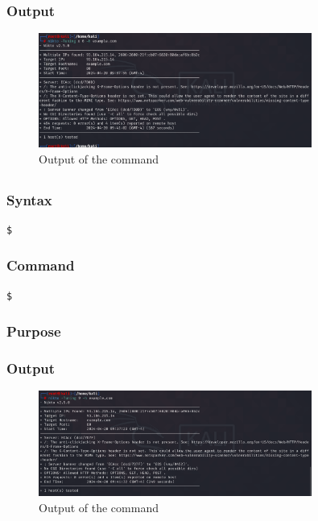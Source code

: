 \documentclass[11pt]{article}
\begin{document}
\subsubsection*{Output}
\begin{figure}[H]
    \centering
    \includegraphics[width=0.8\textwidth]{assignment 8 (5).png}
    \caption{Output of the command}
    \label{fig:1}
\end{figure}

\subsection{}

\subsubsection*{Syntax}
\begin{verbatim}
$
\end{verbatim}

\subsubsection*{Command}
\begin{verbatim}
$
\end{verbatim}

\subsubsection*{Purpose}

\subsubsection*{Output}
\begin{figure}[H]
    \centering
    \includegraphics[width=0.8\textwidth]{assignment 8 (6).png}
    \caption{Output of the command}
    \label{fig:1}
\end{figure}
\end{document}
